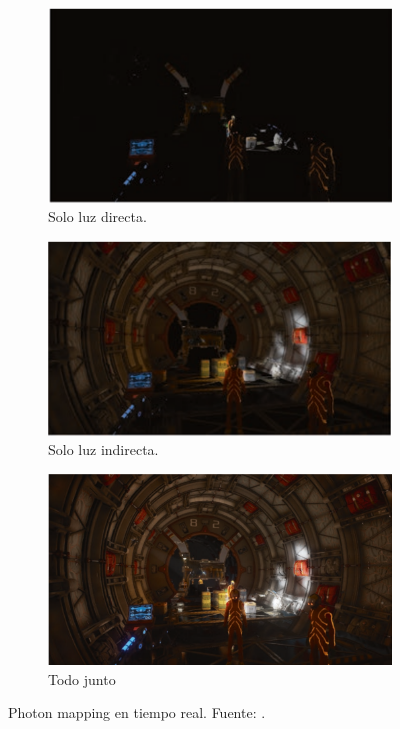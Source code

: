 \begin{figure}
    \begin{subfigure}{.5\textwidth}
        \centering
        \includegraphics[width=\textwidth]{real-time-photon-mapping-direct-only.png}
        \caption{Solo luz directa.}
    \end{subfigure}
    \begin{subfigure}{.5\textwidth}
        \centering
        \includegraphics[width=\textwidth]{real-time-photon-mapping-indirect-only.png}
        \caption{Solo luz indirecta.}
    \end{subfigure}
    \begin{subfigure}{\textwidth}
        \centering
        \includegraphics[width=\textwidth]{real-time-photon-mapping.png}
        \caption{Todo junto}
    \end{subfigure}
    \caption{Photon mapping en tiempo real. Fuente: \cite{real-time-photon-mapping}.}
    \label{fig:real-time-photon-mapping}
\end{figure}

